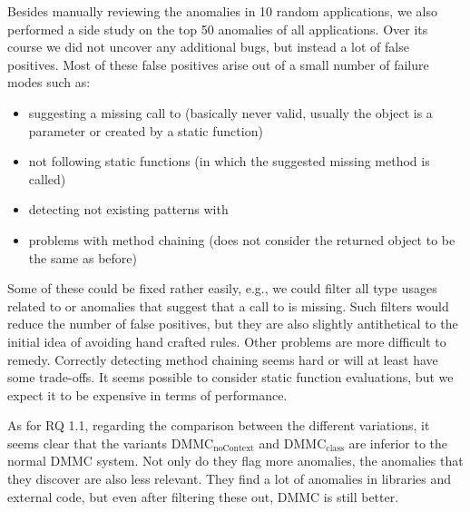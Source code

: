 Besides manually reviewing the anomalies in 10 random applications, we also performed a side study on the top 50 anomalies of all applications.
Over its course we did not uncover any additional bugs, but instead a lot of false positives.
Most of these false positives arise out of a small number of failure modes such as:
\begin{itemize}
    \item suggesting a missing call to  (basically never valid, usually the object is a parameter or created by a static function)
    \item not following static functions (in which the suggested missing method is called)
    \item detecting not existing patterns with 
    \item problems with method chaining (does not consider the returned object to be the same as before)
\end{itemize}
Some of these could be fixed rather easily, e.g., we could filter all type usages related to  or anomalies that suggest that a call to  is missing.
Such filters would reduce the number of false positives, but they are also slightly antithetical to the initial idea of avoiding hand crafted rules.
Other problems are more difficult to remedy.
Correctly detecting method chaining seems hard or will at least have some trade-offs.
It seems possible to consider static function evaluations, but we expect it to be expensive in terms of performance.

As for RQ 1.1, regarding the comparison between the different variations, it seems clear that the variants $\text{DMMC}_\text{noContext}$ and $\text{DMMC}_\text{class}$ are inferior to the normal $\text{DMMC}$ system.
Not only do they flag more anomalies, the anomalies that they discover are also less relevant.
They find a lot of anomalies in libraries and external code, but even after filtering these out, $\text{DMMC}$ is still better.


